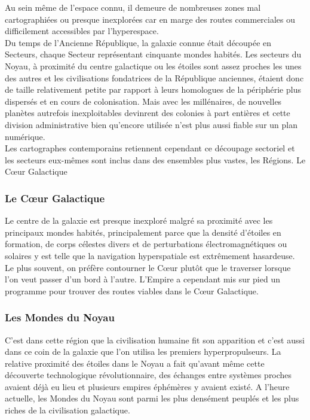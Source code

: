 \documentclass[twoside]{article}
\begin{document}
Au sein même de l'espace connu, il demeure de nombreuses zones mal cartographiées ou presque inexplorées car en marge des routes commerciales ou difficilement accessibles par l'hyperespace.\\

Du temps de l'Ancienne République, la galaxie connue était découpée en Secteurs, chaque Secteur représentant cinquante mondes habités. Les secteurs du Noyau, à proximité du centre galactique ou les étoiles sont assez proches les unes des autres et les civilisations fondatrices de la République anciennes, étaient donc de taille relativement petite par rapport à leurs homologues de la périphérie plus dispersés et en cours de colonisation. Mais avec les millénaires, de nouvelles planètes autrefois inexploitables devinrent des colonies à part entières et cette division administrative bien qu'encore utilisée n'est plus aussi fiable sur un plan numérique.\\

Les cartographes contemporains retiennent cependant ce découpage sectoriel et les secteurs eux-mêmes sont inclus dans des ensembles plus vastes, les Régions. Le C\oe ur Galactique

\subsubsection{Le C\oe ur Galactique}
Le centre de la galaxie est presque inexploré malgré sa proximité avec les principaux mondes habités, principalement parce que la densité d'étoiles en formation, de corps célestes divers et de perturbations électromagnétiques ou solaires y est telle que la navigation hyperspatiale est extrêmement hasardeuse. Le plus souvent, on préfère contourner le C\oe ur plutôt que le traverser lorsque l'on veut passer d'un bord à l'autre. L'Empire a cependant mis sur pied un programme pour trouver des routes viables dans le C\oe ur Galactique. 

\subsubsection{Les Mondes du Noyau}
C'est dans cette région que la civilisation humaine fit son apparition et c'est aussi dans ce coin de la galaxie que l'on utilisa les premiers hyperpropulseurs. La relative proximité des étoiles dans le Noyau a fait qu'avant même cette découverte technologique révolutionnaire, des échanges entre systèmes proches avaient déjà eu lieu et plusieurs empires éphémères y avaient existé. A l'heure actuelle, les Mondes du Noyau sont parmi les plus densément peuplés et les plus riches de la civilisation galactique.\\
\end{document}
